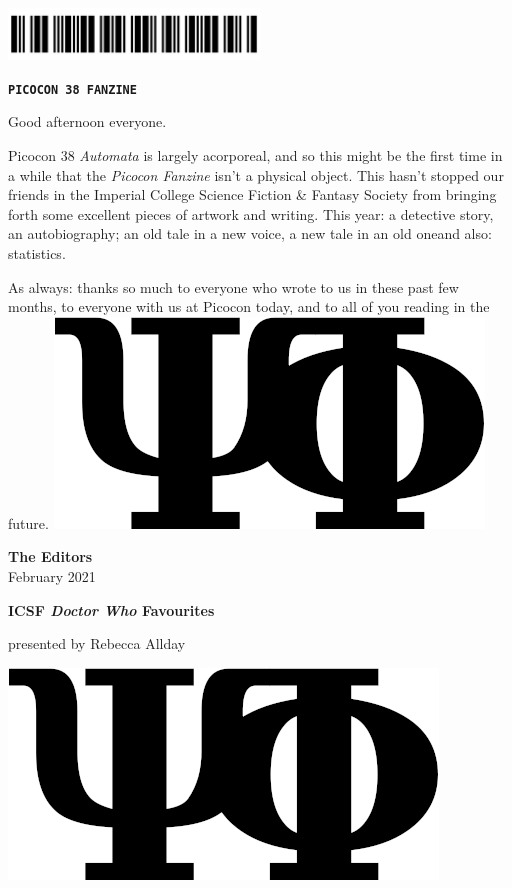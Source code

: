 \documentclass{picocon-fanzine}
\renewcommand{\tombstone}{%
  \includegraphics[height=\fontcharht\font`\B,clip]{img/tombstone}%
}
\begin{document}
\thispagestyle{empty}
\vspace*{8cm}
\begin{center}
\includegraphics[width=0.5\textwidth]{img/cover}
\end{center}
\begin{center}
\texttt{\textbf{PICOCON 38 FANZINE}}
\end{center}
\clearpage
\setcounter{page}{1}

Good afternoon everyone.

Picocon 38 \emph{Automata} is largely acorporeal, and so
this might be the first time in a while that the \emph{Picocon Fanzine} isn't a
physical object. This hasn't stopped our friends in the Imperial College
Science Fiction \& Fantasy Society from bringing forth some excellent pieces of
artwork and writing. This year: a detective story, an autobiography; an old
tale in a new voice, a new tale in an old one\textemdash and also: statistics.

As always: thanks so much to everyone who wrote to us in these past few
months, to everyone with us at Picocon today, and to all of you reading in the
future.
\tombstone

\hfill \parbox{0.5\textwidth}{{\large\textbf{\textemdash{} The Editors}}\\\hspace*{1.7em}February 2021}
\vfill
\tableofcontents
\vfill

\clearpage
{}

\vfill
{}

\clearpage
{}
\hfill
\parbox{0.95\textwidth}{
  {\Large\textbf{ICSF \emph{Doctor Who} Favourites}\par}\vspace{0.2em}
  presented by Rebecca Allday}\par\vspace{1em}

\tombstone
\end{document}
